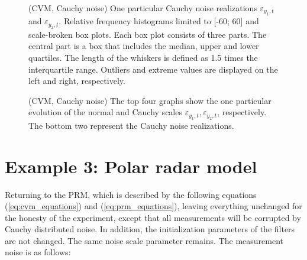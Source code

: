 \begin{figure}[!ht]
\centering
\caption{(CVM, Cauchy noise) One particular Cauchy noise realizations \(\varepsilon_{y_1,t}\) and \(\varepsilon_{y_2,t}\). Relative frequency histograms limited to [-60; 60] and scale-broken box plots. Each box plot consists of three parts. The central part is a box that includes the median, upper and lower quartiles. The length of the whiskers is defined as 1.5 times the interquartile range. Outliers and extreme values are displayed on the left and right, respectively.}
\label{fig:cvm_measurement_noise_cauchy}
\end{figure}

\begin{figure}[!ht]
\centering
\caption{(CVM, Cauchy noise) The top four graphs show the one particular evolution of the normal and Cauchy scales \(\varepsilon_{y_1,t}, \varepsilon_{y_2,t}\), respectively. The bottom two represent the Cauchy noise realizations.}
\label{fig:cvm_abc_scales_evolution_cauchy}
\end{figure}

\section{Example 3: Polar radar model}
Returning to the PRM, which is described by the following equations (\ref{eq:cvm_equations}) and (\ref{eq:prm_equations}), leaving everything unchanged for the honesty of the experiment, except that all measurements will be corrupted by Cauchy distributed noise. In addition, the initialization parameters of the filters are not changed. The same noise scale parameter remains. The measurement noise is as follows:


